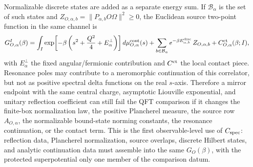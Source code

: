 \begin{construction}
Normalizable discrete states are added as a separate energy sum.  If
\({\mathcal B}_\alpha\) is the set of such states and
\(Z_{O,\alpha,b}=\|P_{\alpha,b}O\Omega\|^2\ge0\), the Euclidean source
two-point function in the same channel is
\begin{equation}
  G_{O,\alpha}^{I}(\beta)
  =
  \int_I
    \exp\!\left[-\beta\left(s^2+\frac{Q^2}{4}+E_\alpha^\perp\right)\right]
    d\mu^{\rm cont}_{O,\alpha}(s)
  +\sum_{b\in{\mathcal B}_\alpha}
    e^{-\beta E_{\alpha,b}^{\rm disc}}\,Z_{O,\alpha,b}
  +C_{O,\alpha}^{\rm ct}(\beta;I),
  \label{eq:cigar-liouville-source-spectral-two-point}
\end{equation}
with \(E_\alpha^\perp\) the fixed angular/fermionic contribution and
\(C^{\rm ct}\) the local contact piece.  Resonance poles may contribute to a
meromorphic continuation of this correlator, but not as positive spectral
delta functions on the real \(s\)-axis.  Therefore a mirror endpoint with the
same central charge, asymptotic Liouville exponential, and unitary reflection
coefficient can still fail the QFT comparison if it changes the finite-box
normalization law, the positive Plancherel measure, the source row
\(A_{O,\alpha}\), the normalizable bound-state norming constants, the
resonance continuation, or the contact term.  This is the first
observable-level use of \(C_{\rm spec}\): reflection data, Plancherel
normalization, source overlaps, discrete Hilbert states, and analytic
continuation data must assemble into the same \(G_O(\beta)\), with the
protected superpotential only one member of the comparison datum.
\end{construction}

